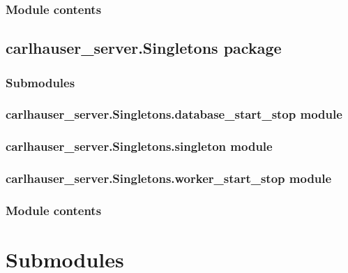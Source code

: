 \documentclass[letterpaper,10pt,english]{sphinxmanual}
\begin{document}
\subsubsection{Module contents}
\label{\detokenize{carlhauser_server.Processus:module-carlhauser_server.Processus}}\label{\detokenize{carlhauser_server.Processus:module-contents}}

\subsection{carlhauser\_server.Singletons package}
\label{\detokenize{carlhauser_server.Singletons:carlhauser-server-singletons-package}}\label{\detokenize{carlhauser_server.Singletons::doc}}

\subsubsection{Submodules}
\label{\detokenize{carlhauser_server.Singletons:submodules}}

\subsubsection{carlhauser\_server.Singletons.database\_start\_stop module}
\label{\detokenize{carlhauser_server.Singletons:carlhauser-server-singletons-database-start-stop-module}}

\subsubsection{carlhauser\_server.Singletons.singleton module}
\label{\detokenize{carlhauser_server.Singletons:carlhauser-server-singletons-singleton-module}}

\subsubsection{carlhauser\_server.Singletons.worker\_start\_stop module}
\label{\detokenize{carlhauser_server.Singletons:carlhauser-server-singletons-worker-start-stop-module}}

\subsubsection{Module contents}
\label{\detokenize{carlhauser_server.Singletons:module-contents}}

\section{Submodules}
\label{\detokenize{carlhauser_server:submodules}}
\end{document}
